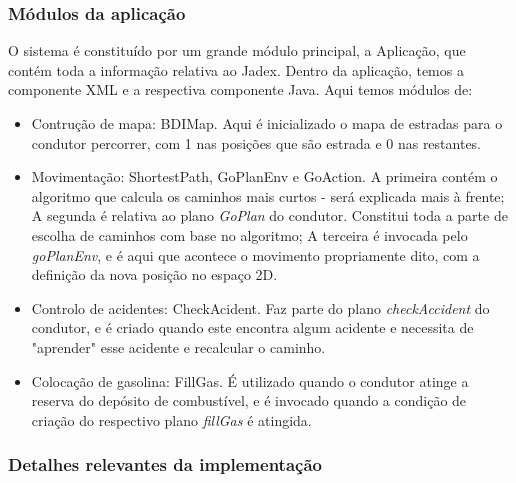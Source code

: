 \documentclass[15pt,a4paper]{article}
\begin{document}
\subsubsection{Módulos da aplicação}

O sistema é constituído por um grande módulo principal, a Aplicação, que contém toda a informação relativa ao Jadex. Dentro da aplicação, temos a componente XML e a respectiva componente Java. Aqui temos módulos de:

\begin{itemize}

\item Contrução de mapa: BDIMap. Aqui é inicializado o mapa de estradas para o condutor percorrer, com 1 nas posições que são estrada e 0 nas restantes.
\item Movimentação: ShortestPath, GoPlanEnv e GoAction. A primeira contém o algoritmo que calcula os caminhos mais curtos - será explicada mais à frente; A segunda é relativa ao plano \textit{GoPlan} do condutor. Constitui toda a parte de escolha de caminhos com base no algoritmo; A terceira é invocada pelo \textit{goPlanEnv}, e é aqui que acontece o movimento propriamente dito, com a definição da nova posição no espaço 2D.
\item Controlo de acidentes: CheckAcident. Faz parte do plano \textit{checkAccident} do condutor, e é criado quando este encontra algum acidente e necessita de "aprender" esse acidente e recalcular o caminho.
\item Colocação de gasolina:  FillGas. É utilizado quando o condutor atinge a reserva do depósito de combustível, e é invocado quando a condição de criação do respectivo plano \textit{fillGas} é atingida. 
\end{itemize}

\subsubsection{Detalhes relevantes da implementação}
\end{document}
